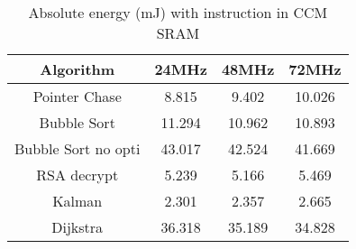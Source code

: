 
\begin{table}[h!]
\centering
\begin{tabular}{||c c c c||} 
 \hline
 Algorithm & 24MHz & 48MHz & 72MHz \\ [0.5ex] 
 \hline\hline
 Pointer Chase & 8.815 & 9.402 & 10.026 \\ 
 Bubble Sort & 11.294 & 10.962 & 10.893 \\
 Bubble Sort no opti & 43.017 & 42.524 & 41.669 \\
 RSA decrypt & 5.239 & 5.166 & 5.469 \\
 Kalman & 2.301 & 2.357 & 2.665 \\
 Dijkstra & 36.318 & 35.189 & 34.828 \\[1ex] 
 \hline
\end{tabular}
\caption{Absolute energy (mJ) with instruction in CCM SRAM}
\label{energy_tab_code_ccm}
\end{table}
